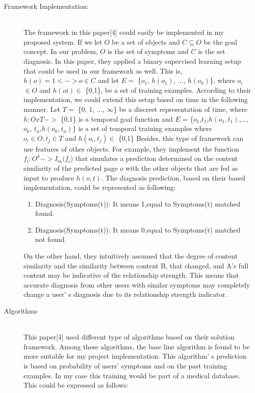 \documentclass[sts]{sig-alternate}
\begin{document}
		\begin{description}
  			\item[Framework Implementation:] \hfill \\				
  				The framework in this paper[4] could easily be implemented in my proposed system. If we 					let $O$ be a set of objects and $C \subseteq O$ be the goal concept. In our problem, $O$ 				is the set of symptoms and $C$ is the set diagnosis. In this paper, they applied a 						binary supervised learning setup that could be used in our framework as well. This is, 					$h(o) = 	1 <-> o \in C$ and let $E =$ \{$o_1$, $h(o_1)$, ..., $h(o_k)$\}, where $o_i$ 						$\in O$ and $h(oi) \in$ \{0,1\}, be a set of training examples. According to their 						implementation, we could extend this setup based on time in the following manner. Let $T 				=$ \{0, 1, ..., $\infty$\} be a discreet representation of time, where $h : OxT ->$ 						\{0,1\} is a temporal goal function and $E$ = \{$o_1$,$t_1$,$h(o_1,t_1)$,...,$o_k$,						$t_n$,$h(o_k,t_n)$\} is a set of temporal training examples where $o_i \in O, t_j \in T$ 				and $h(o_i,t_j) \in$ \{0,1\} Besides, this type of framework can use features of other 					objects. For example, they implement the function $f_i: O^k -> I_m(f_i$) that simulates 					a prediction determined on the content similarity of the predicted page $o$ with the 						other objects that are fed as input to produce $h(o,t)$. The diagnosis prediction, based 				on their based implementation, could be represented as following:

				\begin{enumerate}
  					\item Diagnosis(Symptoms(t)):\newline 
  						It means 1,equal to Symptoms(t) matched found.
  					\item Diagnosis(Symptoms(t)):\newline
  						It means 0,equal to Symptoms(t) matched not found.
				\end{enumerate}
			
				On the other hand, they intuitively assumed that the degree of content similarity and 					the 	similarity 	between content B, that changed, and A's full content may be 								indicative of the relationship strength. This means that accurate diagnosis from other 					users with similar symptoms may completely change a user' s diagnosis due to its 							relationship strength indicator.
		
  			\item[Algorithms] \hfill \\
 				This paper[4] used different type of algorithms based on their solution framework. Among 				these algorithms, the base line algorithm is found to be more suitable for my project 					implementation. This algorithm' s prediction is based on probability of users' symptoms 					and on the past training examples. In my case this training would be part of a medical 					database. This could be expressed as follows:\newline


\end{description}
\end{document}
